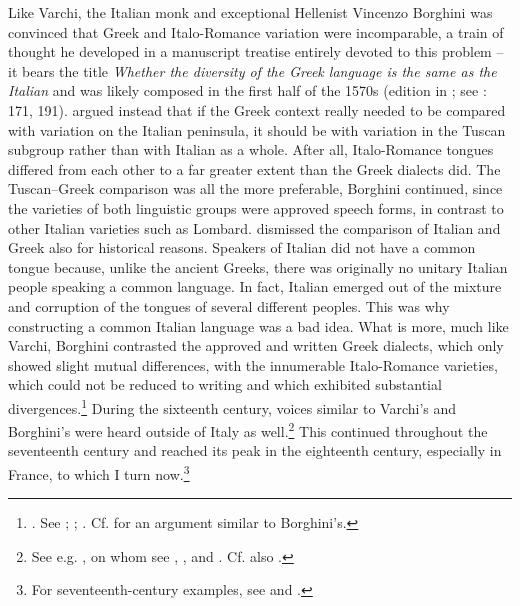 Like Varchi, the Italian monk and exceptional Hellenist Vincenzo Borghini was convinced that Greek and Italo-Romance variation were incomparable, a train of thought he developed in a manuscript treatise entirely devoted to this problem – it bears the title \textit{Whether the diversity of the Greek language is the same as the Italian} and was likely composed in the first half of the 1570s (edition in \citealt{Borghini1971}; see \citealt{Alinei1984}: 171, 191). \citet[335]{Borghini1971} argued instead that if the Greek context really needed to be compared with variation on the Italian peninsula, it should be with variation in the Tuscan subgroup rather than with Italian as a whole. After all, Italo-Romance tongues differed from each other to a far greater extent than the Greek dialects did. The Tuscan–Greek comparison was all the more preferable, Borghini continued, since the varieties of both linguistic groups were approved speech forms, in contrast to other Italian varieties such as Lombard. \citet[338--340]{Borghini1971} dismissed the comparison of Italian and Greek also for historical reasons. Speakers of Italian did not have a common tongue because, unlike the ancient Greeks, there was originally no unitary Italian people speaking a common language. In fact, Italian emerged out of the mixture and corruption of the tongues of several different peoples. This was why constructing a common Italian language was a bad idea. What is more, much like Varchi, Borghini contrasted the approved and written Greek dialects, which only showed slight mutual differences, with the innumerable Italo-Romance varieties, which could not be reduced to writing and which exhibited substantial divergences.\footnote{\citet[341]{Borghini1971}. See \citet[171]{Alinei1984}; \citet[210]{Trovato1984}; \citet[32--37]{Beninca1988}. Cf. \citet[253--254]{Salviati1588} for an argument similar to Borghini’s.} During the sixteenth century, voices similar to Varchi’s and Borghini’s were heard outside of Italy as well.\footnote{See e.g. \citet[595--596]{Wolf1578}, on whom see \citet{Von1856}, \citet[58–59]{Jellinek1898, Jellinek1913}, and \citet[esp. 214--218]{Mattheier2003}. Cf. also \citet[xiii.\textsc{\textsuperscript{v}}]{Palsgrave1530}.} This continued throughout the seventeenth century and reached its peak in the eighteenth century, especially in France, to which I turn now.\footnote{For seventeenth-century examples, see \citet[458--459]{Mambrun1661} and \citet[146--147]{Morhof1685}.}

